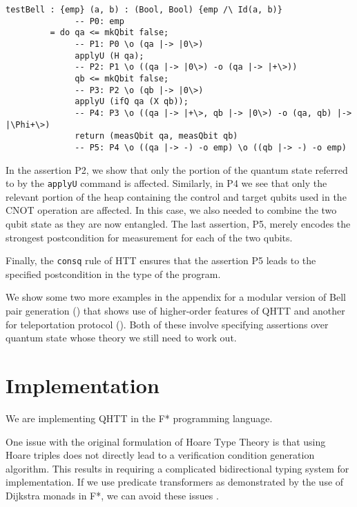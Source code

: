\documentclass[acmsmall,nonacm,timestamp,review=false,anonymous=false]{acmart}
\begin{document}
\begin{lstlisting}[language=QHaskell]
testBell : {emp} (a, b) : (Bool, Bool) {emp /\ Id(a, b)}
              -- P0: emp
         = do qa <= mkQbit false;
              -- P1: P0 \o (qa |-> |0\>)
              applyU (H qa);
              -- P2: P1 \o ((qa |-> |0\>) -o (qa |-> |+\>))
              qb <= mkQbit false;
              -- P3: P2 \o (qb |-> |0\>)
              applyU (ifQ qa (X qb));
              -- P4: P3 \o ((qa |-> |+\>, qb |-> |0\>) -o (qa, qb) |-> |\Phi+\>)
              return (measQbit qa, measQbit qb)
              -- P5: P4 \o ((qa |-> -) -o emp) \o ((qb |-> -) -o emp)
\end{lstlisting}

In the assertion P2, we show that only the portion of the quantum state referred to by the \texttt{applyU} command is affected. Similarly, in P4 we see that only the relevant portion of the heap containing the control and target qubits used in the CNOT operation are affected. In this case, we also needed to combine the two qubit state as they are now entangled. The last assertion, P5, merely encodes the strongest postcondition for measurement for each of the two qubits.

Finally, the \texttt{consq} rule of HTT ensures that the assertion P5 leads to the specified postcondition in the type of the program.

We show some two more examples in the appendix for a modular version of Bell pair generation () that shows use of higher-order features of QHTT and another for teleportation protocol (). Both of these involve specifying assertions over quantum state whose theory we still need to work out.


\section{Implementation}
We are implementing QHTT in the F* programming language.

One issue with the original formulation of Hoare Type Theory is that using Hoare triples does not directly lead to a verification condition generation algorithm. This results in requiring a complicated bidirectional typing system for implementation. If we use predicate transformers as demonstrated by the use of Dijkstra monads in F*, we can avoid these issues \cite{swamy2013verifying}.
\end{document}

